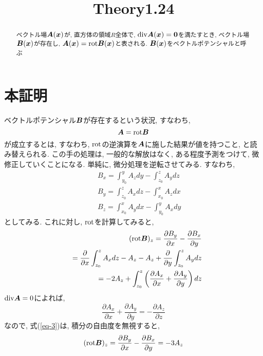 \documentclass{jsarticle} \usepackage[dvipdfmx]{graphicx} \usepackage[dvipdfmx]{hyperref}
\title{Theory1.24}
\newcommand*{\mbold}[1]{\mbox{\boldmath $#1$}}
\newcommand*{\divg}{{\rm div}}
\newcommand*{\rot}{{\rm rot}}
\begin{document}
\maketitle

\begin{abstract}
  ベクトル場$\mbold{A}(\mbold{x})$が, 直方体の領域$R$全体で, $\divg \mbold{A}(\mbold{x}) = \mbold{0}$を満たすとき, ベクトル場$\mbold{B}(\mbold{x})$が存在し, 
  $\mbold{A}(\mbold{x}) = \rot \mbold{B}(\mbold{x})$と表される. 
  $\mbold{B}(\mbold{x})$をベクトルポテンシャルと呼ぶ
\end{abstract}

\section*{本証明}
ベクトルポテンシャル$\mbold{B}$が存在するという状況, すなわち, 
\begin{equation}
  \mbold{A} = \rot\mbold{B}
\end{equation}
が成立するとは, すなわち, $\rot$の逆演算を$\mbold{A}$に施した結果が値を持つこと, と読み替えられる. 
この手の処理は, 一般的な解放はなく, ある程度予測をつけて, 微修正していくことになる.  
単純に, 微分処理を逆転させてみる. 
すなわち, 
\begin{subequations}
  \begin{eqnarray}
    && B_x = \int_{y_0}^y A_z dy - \int_{z_0}^z A_y dz \\
    && B_y = \int_{z_0}^z A_x dz - \int_{x_0}^x A_z dx \\
    && B_z = \int_{x_0}^x A_y dx - \int_{y_0}^y A_x dy
  \end{eqnarray}
\end{subequations}
としてみる. これに対し, $\rot$を計算してみると, 
\begin{eqnarray}\label{eq-3}
  && (\rot\mbold{B})_z = \frac{\partial B_y}{\partial x} - \frac{\partial B_x}{\partial y} \nonumber \\
  && = \frac{\partial}{\partial x}\int_{z_0}^z A_x dz - A_z 
    - A_z + \frac{\partial}{\partial y}\int_{z_0}^z A_y dz \nonumber \\
  && = -2 A_z + \int_{z_0}^z \left(\frac{\partial A_x}{\partial x} + \frac{\partial A_y}{\partial y}\right)dz 
\end{eqnarray}
$\divg\mbold{A} = 0$によれば, 
\[
  \frac{\partial A_x}{\partial x} + \frac{\partial A_y}{\partial y} = -\frac{\partial A_z}{\partial z}
\]
なので, 式(\ref{eq-3})は, 積分の自由度を無視すると,  
\begin{equation}
  (\rot\mbold{B})_z = \frac{\partial B_y}{\partial x} - \frac{\partial B_x}{\partial y}
  = -3 A_z
\end{equation}
\end{document}
